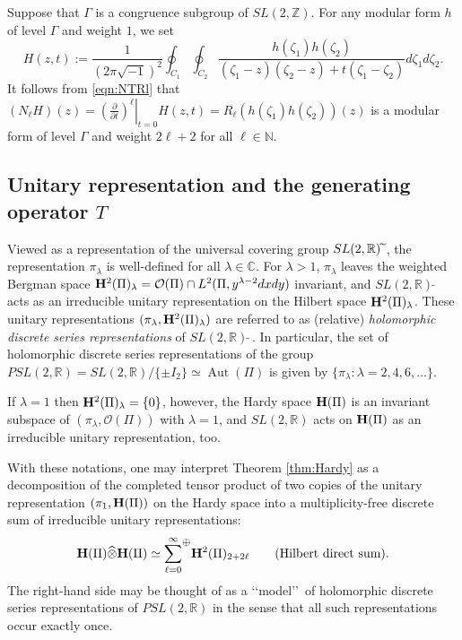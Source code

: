 \documentclass[12pt,leqno]{amsart}
\theoremstyle{plain}
\theoremstyle{definition}
\begin{document}
Suppose that $\Gamma$ is a congruence subgroup of $SL(2,{\mathbb{Z}})$.  
For any modular form $h$
 of level $\Gamma$ and weight $1$, 
 we set 
\[
  H(z,t):=
  \frac{1}{(2 \pi \sqrt{-1})^2}
  \oint_{C_1} \oint_{C_2} \frac{h(\zeta_1)h(\zeta_2)}{(\zeta_1-z)(\zeta_2-z)+t(\zeta_1-\zeta_2)} d \zeta_1 d \zeta_2.  
\]
It follows from \eqref{eqn:NTRl}
 that 
$
   (N_{\ell}H)(z)
  =\left. (\frac{\partial}{\partial t})^{\ell}\right|_{t=0}H(z,t)
  =R_{\ell}(h(\zeta_1) h(\zeta_2))(z)
$
 is a modular form
 of level $\Gamma$ and weight $2 \ell +2$ for all $\ell \in {\mathbb{N}}$.  



\subsection{Unitary representation and the generating operator $T$}
\label{subsec:6.3}
Viewed as a representation 
of the universal covering group $SL(2,{\mathbb{R}})\widetilde{\hphantom{i}}$, 
 the representation $\pi_{\lambda}$ is well-defined
 for all $\lambda \in {\mathbb{C}}$.  
For $\lambda>1$, 
 $\pi_{\lambda}$ leaves the weighted Bergman space
$
{\bf{H}}^2(\Pi)_{\lambda}
 =
{\mathcal{O}}(\Pi) \cap L^2(\Pi, y^{\lambda-2}d x d y)
$
 invariant, 
 and $SL(2,{\mathbb{R}})\tilde{\,\,}$ acts
 as an irreducible unitary representation
 on the Hilbert space ${\bf{H}}^2(\Pi)_{\lambda}$.  
These unitary representations $(\pi_{\lambda}, {\bf{H}}^2(\Pi)_{\lambda})$
 are referred 
 to as (relative) {\it{holomorphic discrete series representations}}
 of $SL(2,{\mathbb{R}})\tilde{\,\,}$. 
In particular, 
 the set of holomorphic discrete series representations
 of the group $P S L(2,{\mathbb{R}}) = S L(2,{\mathbb{R}})/\{\pm I_2\} \simeq \operatorname{Aut}(\Pi)$
 is given by $\{\pi_{\lambda}:\lambda=2,4,6,\dots \}$.  



If $\lambda=1$
 then ${\bf{H}}^2(\Pi)_{\lambda}=\{0\}$, 
 however, 
 the Hardy space ${\bf{H}}(\Pi)$ is an invariant subspace
 of $(\pi_{\lambda}, {\mathcal{O}}(\Pi))$ 
 with $\lambda=1$, 
 and $SL(2,{\mathbb{R}})$ acts  on ${\bf{H}}(\Pi)$ as an irreducible unitary representation, 
 too.  



With these notations, 
 one may interpret Theorem \ref{thm:Hardy} 
 as a decomposition
 of the completed tensor product
 of two copies of the unitary representation
 $(\pi_1, {\bf{H}}(\Pi))$
 on the Hardy space
 into a multiplicity-free discrete sum
 of irreducible unitary representations:
\[
   {\bf{H}}(\Pi) \widehat \otimes {\bf{H}}(\Pi)
   \simeq
   {\overset{\infty}{\underset{\ell=0}\sum}}^{\lower1ex\hbox{\footnotesize{$\oplus$}}} {\bf{H}}^2 (\Pi)_{2+2\ell}
\qquad
\text{(Hilbert direct sum)}.
\]
The right-hand side may be thought
 of as a \lq\lq{model}\rq\rq\
 of holomorphic discrete series representations
 of $PSL(2,{\mathbb{R}})$
 in the sense 
that all such representations occur exactly once.  
\end{document}
